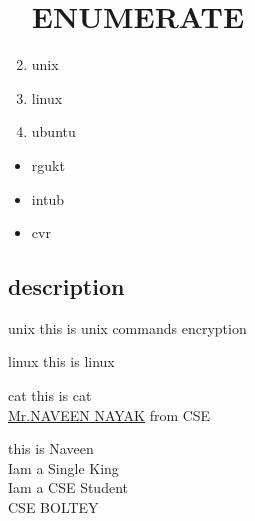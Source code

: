 \documentclass{article}
\begin{document}
   	   \begin{enumerate}
   	   	\section{ENUMERATE}
   	   	\item unix
   	   	\item linux
   	   	\item ubuntu
   	   	
   	   \end{enumerate}
      
      \begin{itemize}
      	\section{itemize}
      	\item rgukt
      	\item intub
      	\item cvr
      	
      \end{itemize}
  
       \begin{description}
       	\section{description}
       	\item{unix} this is unix commands encryption
       	\item{linux} this is linux
       	\item{cat} this is cat\\
       	\underline{Mr.NAVEEN NAYAK} from CSE
       	
       	
       \end{description}
   
   \large this is Naveen\\
   \LARGE Iam a Single King\\
   \huge Iam a CSE Student\\
   \Huge CSE BOLTEY\\
   
   
\end{document}
